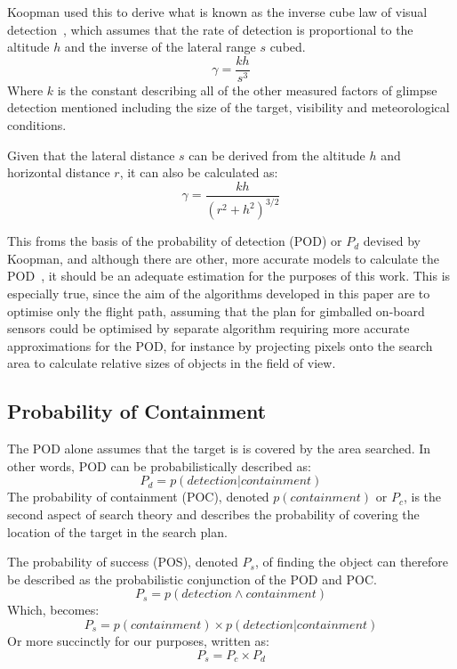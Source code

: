 \documentclass[10pt,a4paper, oneside, conference]{IEEEtran}
\begin{document}
	Koopman used this to derive what is known as the inverse cube law of visual detection~\cite{doi:10.1287/opre.4.5.503}, which assumes that the rate of detection is proportional to the altitude $h$ and the inverse of the lateral range $s$ cubed.
	\begin{equation}
	\label{equation:lateralInverseSquareLaw}
	\gamma = \frac{kh}{s^3}
	\end{equation}
	Where $k$ is the constant describing all of the other measured factors of glimpse detection mentioned including the size of the target, visibility and meteorological conditions. 
	
	Given that the lateral distance $s$ can be derived from the altitude $h$ and horizontal distance $r$, it can also be calculated as:
	 \begin{equation}
	\label{equation:horizontalInverseSquareLaw}
	\gamma = \frac{kh}{(r^2+h^2)^{3/2}}
	\end{equation}
	
	This froms the basis of the probability of detection (POD) or $P_d$ devised by Koopman, and although there are other, more accurate models to calculate the POD~\cite{Washburn1993}, it should be an adequate estimation for the purposes of this work.
	This is especially true, since the aim of the algorithms developed in this paper are to optimise only the flight path, assuming that the plan for gimballed on-board sensors could be optimised by separate algorithm requiring more accurate approximations for the POD, for instance by projecting pixels onto the search area to calculate relative sizes of objects in the field of view.
	
	\subsection{Probability of Containment}	
	
	The POD alone assumes that the target is is covered by the area searched.
	In other words, POD can be probabilistically described as:
	$$
	P_d=p(detection | containment)
	$$ 
	The probability of containment (POC), denoted $p(containment)$ or $P_c$, is the second aspect of search theory and describes the probability of covering the location of the target in the search plan.
	
	The probability of success (POS), denoted $P_s$, of finding the object can therefore be described as the probabilistic conjunction of the POD and POC.
	$$
	P_s=p(detection \land containment)
	$$
	Which, becomes:
	$$
	P_s=p(containment) \times p(detection|containment)
	$$
	Or more succinctly for our purposes, written as:
	\begin{equation}
	\label{equation:probabilityOfSuccess}
	P_s=P_c \times P_d
	\end{equation}
	
\end{document}
